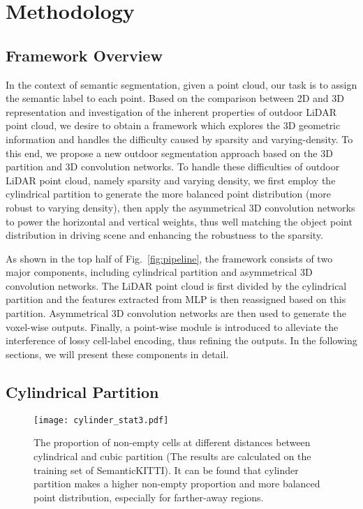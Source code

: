 \documentclass[final]{cvpr}
\begin{document}
%
 
\section{Methodology}
\label{sec:methods}



\subsection{Framework Overview}

In the context of semantic segmentation, given a point cloud, our task is to assign the semantic label to each point.
 Based on the comparison between 2D and 3D representation and investigation of the inherent properties of outdoor LiDAR point cloud, we desire to obtain a framework which explores the 3D geometric information and handles the difficulty caused by sparsity and varying-density. To this end, we propose a new outdoor segmentation approach based on the 3D partition and 3D convolution networks. To handle these difficulties of outdoor LiDAR point cloud, namely sparsity and varying density, we first employ the cylindrical partition to generate the more balanced point distribution (more robust to varying density), then apply the asymmetrical 3D convolution networks to power the horizontal and vertical weights, thus well matching the object point distribution in driving scene and enhancing the robustness to the sparsity. 


As shown in the top half of Fig.~\ref{fig:pipeline}, the framework consists of two major components, including cylindrical partition and asymmetrical 3D convolution networks. The LiDAR point cloud is first divided by the cylindrical partition and the features extracted from MLP is then reassigned based on this partition. Asymmetrical 3D convolution networks are then used to generate the voxel-wise outputs. Finally, a point-wise module is introduced to alleviate the interference of lossy cell-label encoding, thus refining the outputs. In the following sections, we will present these components in detail.


\subsection{Cylindrical Partition}


    
    \begin{figure}[t]
    \centering
    \texttt{[image: cylinder\_stat3.pdf]}
    \caption{The proportion of non-empty cells at different distances between cylindrical and cubic partition (The results are calculated on the training set of SemanticKITTI). It can be found that cylinder partition makes a higher non-empty proportion and more balanced point distribution, especially for farther-away regions.}
    \label{fig:stat3}
    \end{figure}
\end{document}
